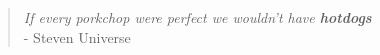 \clearpage
\vspace*{\fill}
\thispagestyle{empty} %
\begin{quotation}%
\textit{If every porkchop were perfect we wouldn't have \textbf{hotdogs}}
\medskip
\raggedleft
\\
 - Steven Universe
\end{quotation}
\vspace*{\fill}